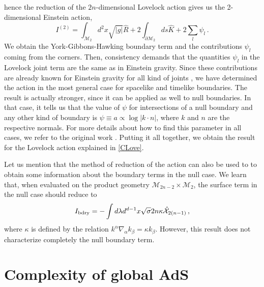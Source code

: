 \documentclass[11pt,letterpaper]{article}
\begin{document}
hence the reduction of the $2n$-dimensional Lovelock action gives us the 2-dimensional Einstein action,
\begin{equation}
I^{(2)}=\int_{\mathcal{M}_{2}}d^{2}x\sqrt{|g|}\hat{R} +2\int_{\partial \mathcal{M}_2}ds  \hat K+2\sum_l\psi_l\, .
\end{equation}
We obtain the York-Gibbons-Hawking boundary term and the contributions $\psi_l$ coming from the corners. Then, consistency demands that the quantities $\psi_l$ in the Lovelock joint term are the same as in Einstein gravity. Since these contributions are already known for Einstein gravity for all kind of joints \cite{Lehner:2016vdi}, we have determined the action in the most general case for spacelike and timelike boundaries. The result is actually stronger, since it can be applied as well to null boundaries. In that case, it tells us that the value of $\psi$ for intersections of a null boundary and any other kind of boundary is $\psi\equiv a\propto \log|k\cdot n|$, where $k$ and $n$ are the respective normals. For more details about how to find this parameter in all cases, we refer to the original work \cite{Lehner:2016vdi}.
Putting it all together, we obtain the result for the Lovelock action explained in \ref{CLove}.

Let us mention that the method of reduction of the action can also be used to to obtain some information about the boundary terms in the null case. We learn that, when evaluated on the product geometry $\mathcal{M}_{2n-2}\times\mathcal{M}_2$, the surface term in the null case should reduce to
\begin{equation}
I_{\rm bdry}=-\int d\lambda d^{d-1}x\sqrt{\sigma} 2n\kappa \hat{\mathcal{X}}_{2(n-1)}\, ,
\end{equation}
where $\kappa$ is defined by the relation $k^{\alpha}\nabla_{\alpha}k_{\beta}=\kappa k_{\beta}$. However, this result does not characterize completely the null boundary term. 







\section{Complexity of global AdS}\label{3}
\end{document}
